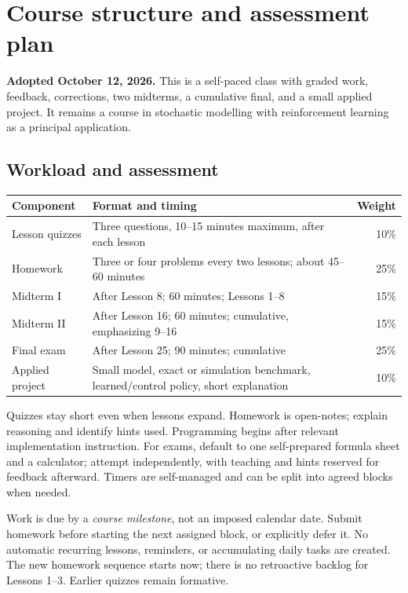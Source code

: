 \documentclass[11pt]{article}
\theoremstyle{remark}\newtheorem{remark}[definition]{Remark}
\begin{document}
\clearpage
{}
\section*{Course structure and assessment plan}
\textbf{Adopted October 12, 2026.} This is a self-paced class with graded work, feedback, corrections, two midterms, a cumulative final, and a small applied project. It remains a course in stochastic modelling with reinforcement learning as a principal application.

\subsection*{Workload and assessment}
\begin{center}\small
\begin{tabular}{@{}p{1.12in}p{2.95in}r@{}}\toprule
Component & Format and timing & Weight\\\midrule
Lesson quizzes & Three questions, 10--15 minutes maximum, after each lesson & 10\%\\
Homework & Three or four problems every two lessons; about 45--60 minutes & 25\%\\
Midterm I & After Lesson 8; 60 minutes; Lessons 1--8 & 15\%\\
Midterm II & After Lesson 16; 60 minutes; cumulative, emphasizing 9--16 & 15\%\\
Final exam & After Lesson 25; 90 minutes; cumulative & 25\%\\
Applied project & Small model, exact or simulation benchmark, learned/control policy, short explanation & 10\%\\\bottomrule
\end{tabular}\end{center}
Quizzes stay short even when lessons expand. Homework is open-notes; explain reasoning and identify hints used. Programming begins after relevant implementation instruction. For exams, default to one self-prepared formula sheet and a calculator; attempt independently, with teaching and hints reserved for feedback afterward. Timers are self-managed and can be split into agreed blocks when needed.

Work is due by a \emph{course milestone}, not an imposed calendar date. Submit homework before starting the next assigned block, or explicitly defer it. No automatic recurring lessons, reminders, or accumulating daily tasks are created. The new homework sequence starts now; there is no retroactive backlog for Lessons 1--3. Earlier quizzes remain formative.
\end{document}

